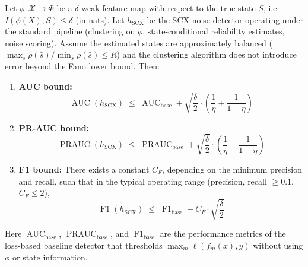 \begin{theorem}
\label{thm:weak-feature}
Let $\phi: \mathcal{X} \to \Phi$ be a $\delta$-weak feature map with respect to
the true state $S$, i.e.\ $I(\phi(X); S) \leq \delta$ (in nats). Let
$h_{\text{SCX}}$ be the SCX noise detector operating under the standard
pipeline (clustering on $\phi$, state-conditional reliability estimates,
noise scoring). Assume the estimated states are approximately balanced
($\max_{\hat{s}} \rho(\hat{s}) / \min_{\hat{s}} \rho(\hat{s}) \leq R$) and
the clustering algorithm does not introduce error beyond the Fano lower bound.
Then:

\begin{enumerate}
\item[(a)] \textbf{AUC bound:}
\begin{equation}
\boxed{\;
\operatorname{AUC}(h_{\text{SCX}}) \;\leq\;
\operatorname{AUC}_{\text{base}} +
\sqrt{\frac{\delta}{2}}\cdot\left(\frac{1}{\eta} + \frac{1}{1-\eta}\right)
\;}
\label{eq:auc-bound}
\end{equation}

\item[(b)] \textbf{PR-AUC bound:}
\begin{equation}
\boxed{\;
\operatorname{PRAUC}(h_{\text{SCX}}) \;\leq\;
\operatorname{PRAUC}_{\text{base}} +
\sqrt{\frac{\delta}{2}}\cdot\left(\frac{1}{\eta} + \frac{1}{1-\eta}\right)
\;}
\label{eq:prauc-bound}
\end{equation}

\item[(c)] \textbf{F1 bound:}
There exists a constant $C_F$, depending on the minimum precision and recall,
such that in the typical operating range (precision, recall $\geq 0.1$,
$C_F \leq 2$),
\begin{equation}
\boxed{\;
\operatorname{F1}(h_{\text{SCX}}) \;\leq\;
\operatorname{F1}_{\text{base}} + C_F \cdot \sqrt{\frac{\delta}{2}}
\;}
\label{eq:f1-bound}
\end{equation}
\end{enumerate}

Here $\operatorname{AUC}_{\text{base}}$,
$\operatorname{PRAUC}_{\text{base}}$, and $\operatorname{F1}_{\text{base}}$
are the performance metrics of the loss-based baseline detector that thresholds
$\max_m \ell(f_m(x), y)$ without using $\phi$ or state information.
\end{theorem}

